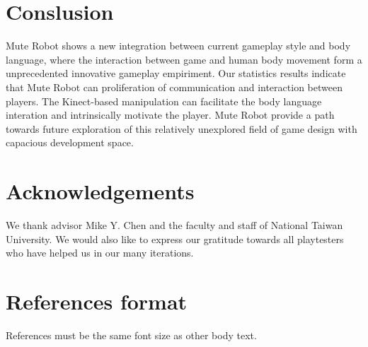 \documentclass{chi-ext}
\begin{document}
\section{Conslusion}
Mute Robot shows a new integration between current gameplay style and body language, where the interaction between game and human body movement form a unprecedented innovative gameplay empiriment.
Our statistics results indicate that Mute Robot can proliferation of communication and interaction between players.
The Kinect-based manipulation can facilitate the body language interation and intrinsically motivate the player.
Mute Robot provide a path towards future exploration of this relatively unexplored field of game design with capacious development space.



\section{Acknowledgements}
We thank advisor Mike Y. Chen and the faculty and staff of National Taiwan University.
We would also like to express our gratitude towards all playtesters who have helped us in our many iterations. 


\section{References format}
References must be the same font size as other body text.

\balance


\end{document}
